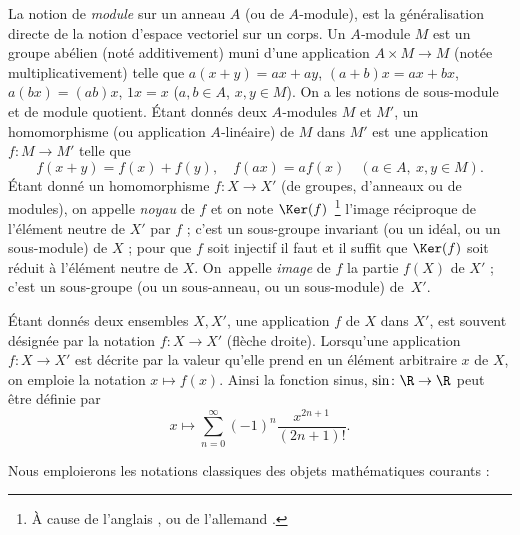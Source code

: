 \documentclass[11pt, %
  title in boldface,
  theorem in new line,
  theorem numbering = section,
  number theorems separately,
  simple name,
]{beaulivre}
\begin{document}
    La notion de \emph{module} sur un anneau \( A \) (ou de \( A \)‑module), est la généralisation directe de la notion d'espace vectoriel sur un corps. Un \( A \)‑module \( M \) est un groupe abélien (noté additivement) muni d'une application \( A \times M \to M \) (notée multiplicativement) telle que \( a(x+y) = ax + ay \), \( (a+b)x = ax+bx \), \( a(bx) = (ab)x \), \( 1 x = x \) (\( a,b \in A \), \( x,y \in M \)). On a les notions de sous-module et de module quotient. Étant donnés deux \( A \)‑modules \( M \) et \( M' \), un homomorphisme (ou application \( A \)‑linéaire) de \( M \) dans \( M' \) est une application \( f \colon M \to M' \) telle que
    \[
        f(x+y) = f(x)+f(y), \quad f(ax) = af(x) \quad (a \in A, ~ x,y \in M).
    \]
    Étant donné un homomorphisme \( f \colon X \to X' \) (de groupes, d'anneaux ou de modules), on appelle \emph{noyau} de \( f \) et on note \( \Ker(f) \)~\footnote{À cause de l'anglais , ou de l'allemand .} l'image réciproque de l'élément neutre de \( X' \) par \( f \) ; c'est un sous-groupe invariant (ou un idéal, ou un sous-module) de \( X \) ; pour que \( f \) soit injectif il faut et il suffit que \( \Ker(f) \) soit réduit à l'élément neutre de \( X \). On~appelle \emph{image} de \( f \) la partie \( f(X) \) de \( X' \) ; c'est un sous-groupe (ou un sous-anneau, ou un sous-module) de~\( X' \).

\enlargethispage*{\baselineskip}
    Étant donnés deux ensembles \( X, X' \), une application \( f \) de \( X \) dans \( X' \), est souvent désignée par la notation \( f \colon X \to X' \) (flèche droite). Lorsqu'une application \( f \colon X \to X' \) est décrite par la valeur qu'elle prend en un élément arbitraire \( x \) de \( X \), on emploie la notation \( x \mapsto f(x) \). Ainsi la fonction sinus, \( \sin \colon \R \to \R \) peut être définie par
    \[
        x \mapsto \sum_{n=0}^{\infty} (-1)^n \frac{x^{2n+1}}{(2n+1)!}.
    \]

    Nous emploierons les notations classiques des objets mathématiques courants :
\end{document}
